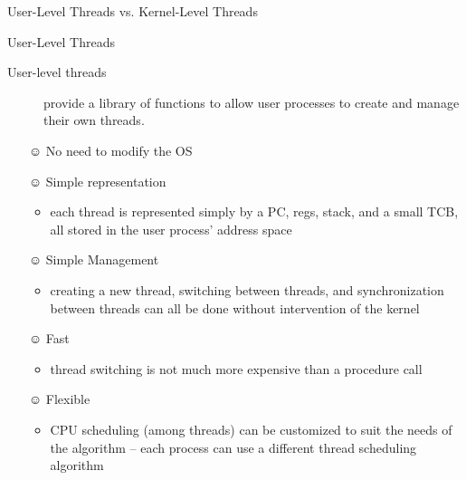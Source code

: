\begin{frame}{User-Level Threads vs. Kernel-Level Threads}
  \begin{center}
  \end{center}
\end{frame}

\begin{frame}{User-Level Threads}
  \begin{description}
  \item[User-level threads] provide a library of functions to allow user processes to create and
    manage their own threads.
  \end{description}
  \begin{itemize}
  \item[☺] No need to modify the OS\\[-.5ex]
  \item[☺] Simple representation\\[-.5ex]
    \begin{itemize}
    \item each thread is represented simply by a PC, regs, stack, and a small TCB, all
        stored in the user process' address space
    \end{itemize}
  \item[☺] Simple Management\\[-.5ex]
    \begin{itemize}
    \item creating a new thread, switching between threads, and synchronization between threads can
      all be done without intervention of the kernel
    \end{itemize}
  \item[☺] Fast\\[-.5ex]
    \begin{itemize}
    \item thread switching is not much more expensive than a procedure call
    \end{itemize}
  \item[☺] Flexible\\[-.5ex]
    \begin{itemize}
    \item CPU scheduling (among threads) can be customized to suit the needs of the algorithm --
      each process can use a different thread scheduling algorithm
    \end{itemize}
  \end{itemize}
\end{frame}

